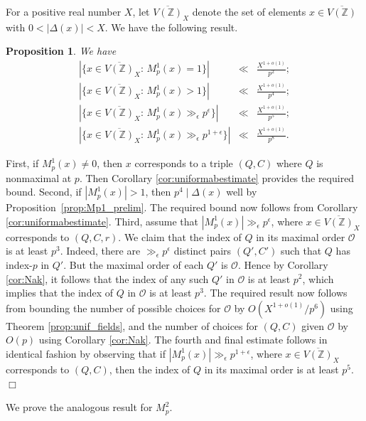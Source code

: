 \documentclass{article}
\def\Z{{\mathbb Z}}
\def\cO{{\mathcal O}}
\def\Z{{\mathbb Z}}
\def\ol{\overline}
\newtheorem{proposition}[theorem]{Proposition}
\newenvironment{proof}{\noindent {\bf Proof:}}{$\Box$ \vspace{2 ex}}
\begin{document}
For a positive real number $X$, let $\ol{V(\Z)}_X$ denote the set of elements $x\in \ol{V(\Z)}$ with $0<|\Delta(x)|<X$. We have the following result.
\begin{proposition}\label{prop:unifMp1}
We have
\begin{equation*}
\begin{array}{rcl}
|\{x\in\ol{V(\Z)}_X:\,M_p^1(x)= 1\}|
&\ll& \displaystyle\frac{X^{1+o(1)}}{p^2}; \\[.15in]
|\{x\in\ol{V(\Z)}_X:\,M_p^1(x)> 1\}|
&\ll& \displaystyle\frac{X^{1+o(1)}}{p^4}; \\[.15in]
|\{x\in\ol{V(\Z)}_X:\,M_p^1(x)\gg_\epsilon p^\epsilon\}|
&\ll& \displaystyle\frac{X^{1+o(1)}}{p^5}; \\[.15in]
|\{x\in\ol{V(\Z)}_X:\,M_p^1(x)\gg_\epsilon p^{1+\epsilon}\}|
&\ll& \displaystyle\frac{X^{1+o(1)}}{p^8}. 
\end{array}
\end{equation*}    
\end{proposition}
\begin{proof}
First, if $M_p^1(x)\neq 0$, then $x$ corresponds to a triple $(Q,C)$ where $Q$ is nonmaximal at $p$. Then Corollary \ref{cor:uniformabestimate} provides the required bound. Second, if $|M_p^1(x)|>1$, then $p^4\mid\Delta(x)$ well by Proposition~\ref{prop:Mp1_prelim}. The required bound now follows from Corollary \ref{cor:uniformabestimate}.
Third, assume that $|M_p^1(x)|\gg_\epsilon p^\epsilon$, where $x\in\ol{V(\Z)}_X$ corresponds to $(Q,C,r)$. We claim that the index of $Q$ in its maximal order $\cO$ is at least $p^3$. Indeed, there are $\gg_\epsilon p^\epsilon$ distinct pairs $(Q',C')$ such that $Q$ has index-$p$ in $Q'$. But the maximal order of each $Q'$ is $\cO$. Hence by Corollary \ref{cor:Nak}, it follows that the index of any such $Q'$ in $\cO$ is at least $p^2$, which implies that the index of $Q$ in $\cO$ is at least $p^3$. The required result now follows from bounding the number of possible choices for $\cO$ by $O(X^{1+o(1)}/p^{6})$ using Theorem \ref{prop:unif_fields}, and the number of choices for $(Q,C)$ given $\cO$ by $O(p)$ using Corollary \ref{cor:Nak}. The fourth and final estimate follows in identical fashion by observing that if $|M_p^1(x)|\gg_\epsilon p^{1+\epsilon}$, where $x\in\ol{V(\Z)}_X$ corresponds to $(Q,C)$, then the index of $Q$ in its maximal order is at least $p^5$.
\end{proof}

We prove the analogous result for $M_p^2$.
\end{document}
